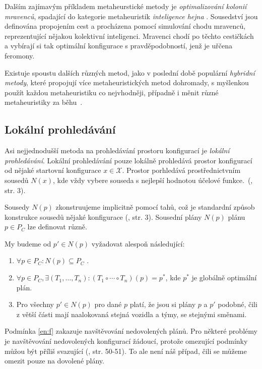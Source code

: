 Dalším zajímavým příkladem metaheurstické metody je \textit{optimalizování kolonií mravenců}, spadající do kategorie metaheuristik \textit{inteligence hejna} \cite{ACO}.
Sousedství jsou definována propojením cest a procházena pomocí simulování chodu mravenců, reprezentující nějakou kolektivní inteligenci.
Mravenci chodí po těchto cestičkách a vybírají si tak optimální konfigurace s pravděpodobností, jenž je uřčena feromony.

Existuje spoustu dalších různých metod, jako v poslední době populární \textit{hybridní metody},
které propojují více metaheuristických metod dohromady, s myšlenkou použít každou metaheuristiku co nejvhodněji,
případně i měnit různé metaheuristiky za běhu~\cite{HybridMeta}.

\subsection{Lokální prohledávání}

Asi nejjednodušší metoda na prohledávání prostoru konfigurací je \textit{lokální prohledávání}.
Lokální prohledávání pouze lokálně prohledává prostor konfigurací od nějaké startovní konfigurace $x \in \mathcal{X}$. 
Prostor porhledává prostřednictvním sousedů $N(x)$, kde vždy vybere souseda s nejlepší hodnotou účelové funkce.~(\citet{HybridMeta}, str. 3).

Sousedy $N(p)$ zkonstruujeme implicitně pomocí tahů, což je standardní způsob konstrukce sousedů nějaké konfigurace (\citet{HybridMeta}, str. 3).
Sousední plány $N(p)$ plánu $p \in P_C$ lze definovat různě. 

My budeme od $p' \in N(p)$ vyžadovat alespoň následující:
\begin{enumerate}
  \item $\forall p \in P_C \colon N(p) \subseteq P_C$ \label{en:f}.
  \item $\forall p \in P_C, \exists(T_1, \dots, T_n) \colon (T_1 \circ \cdots \circ T_n)(p) = p^*$, kde $p^*$ je globálně optimální plán. \label{en:s}
  \item Pro všechny $p' \in N(p)$ pro dané $p$ platí, že jsou si plány $p$ a $p'$ podobné, čili z větší části mají naalokovaná stejná vozidla a týmy, se stejnými směnami. \label{en:t}
\end{enumerate}

Podmínka \ref{en:f} zakazuje navštěvování nedovolených plánů. Pro některé problémy je navštěvování nedovolených konfigurací žádoucí,
protože omezující podmínky můžou být příliš svazující (\citet{GlovKoch03}, str. 50-51).
To ale není náš případ, čili se můžeme omezit pouze na dovolené plány.


